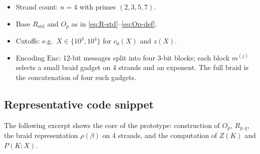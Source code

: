 \documentclass[11pt]{article}
\begin{document}
\begin{itemize}
  \item Strand count: $n=4$ with primes $(2,3,5,7)$.
  \item Base $R_{\mathrm{std}}$ and $O_p$ as in \eqref{eq:R-std}--\eqref{eq:Op-def}.
  \item Cutoffs: e.g.\ $X\in\{10^3,10^4\}$ for $c_0(X)$ and $z(X)$.
  \item Encoding $\mathrm{Enc}$: 12-bit messages split into four 3-bit blocks; each block $m^{(j)}$ selects a small braid gadget on 4 strands and an exponent. The full braid is the concatenation of four such gadgets.
\end{itemize}

\subsection{Representative code snippet}

The following excerpt shows the core of the prototype: construction of $O_p$, $R_{p,q}$, the braid representation $\rho(\beta)$ on 4 strands, and the computation of $Z(K)$ and $P(K;X)$.
\end{document}
